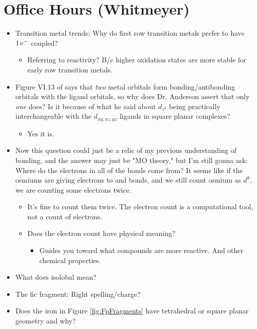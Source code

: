 \documentclass[../notes.tex]{subfiles}
\begin{document}
\section{Office Hours (Whitmeyer)}
\begin{itemize}
    \item {}Transition metal trends: Why do first row transition metals prefer to have $1\,\e[-]$ coupled?
    \begin{itemize}
        \item Referring to reactivity? B/c higher oxidation states are more stable for early row transition metals.
    \end{itemize}
    \item Figure VI.13 of \textcite{bib:CHEM20100Notes} says that \emph{two} metal orbitals form bonding/antibonding orbitals with the ligand orbitals, so why does Dr. Anderson assert that only \emph{one} does? Is it because of what he said about $d_{z^2}$ being practically interchangeable with the $d_{xy,xz,yz}$ ligands in square planar complexes?
    \begin{itemize}
        \item Yes it is.
    \end{itemize}
    \item Now this question could just be a relic of my previous understanding of bonding, and the answer may just be "MO theory," but I'm still gonna ask: Where do the electrons in all of the bonds come from? It seems like if the osmiums are giving electrons to  and  bonds, and we still count osmium as $d^8$, we are counting some electrons twice.
    \begin{itemize}
        \item It's fine to count them twice. The electron count is a computational tool, not a count of electrons.
        \item Does the electron count have physical meaning?
        \begin{itemize}
            \item Guides you toward what compounds are more reactive. And other chemical properties.
        \end{itemize}
    \end{itemize}
    \item What does isolobal mean?
    \item The fic fragment: Right spelling/charge?
    \item Does the iron in Figure \ref{fig:FpFragments} have tetrahedral or square planar geometry and why?

\end{itemize}
\end{document}

